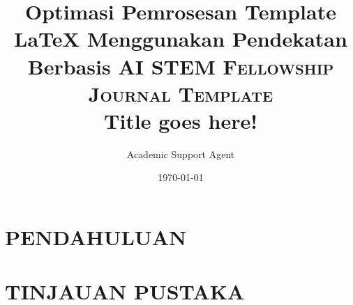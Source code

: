 \documentclass{article}
\title{Optimasi Pemrosesan Template LaTeX Menggunakan Pendekatan Berbasis AI}
\author{Academic Support Agent}
\date{\today}
\begin{document}
\maketitle

\begin{abstract}

\end{abstract}

\chapter{PENDAHULUAN}


\chapter{TINJAUAN PUSTAKA}





\usepackage[spanish,english]{babel}
\usepackage[utf8x]{inputenc}
\usepackage[T1]{fontenc}

\usepackage[a4paper,top=3cm,bottom=2cm,left=3cm,right=3cm,marginparwidth=1.75cm]{geometry}

\usepackage{amsmath}
\usepackage{graphicx}
\usepackage[colorinlistoftodos]{todonotes}
\usepackage[colorlinks=true, allcolors=blue]{hyperref}

\title{
		\normalfont \normalsize \textsc{STEM Fellowship Journal Template} \\ [14pt]
		\huge Title goes here! \\
}

\usepackage{authblk}
\end{document}
